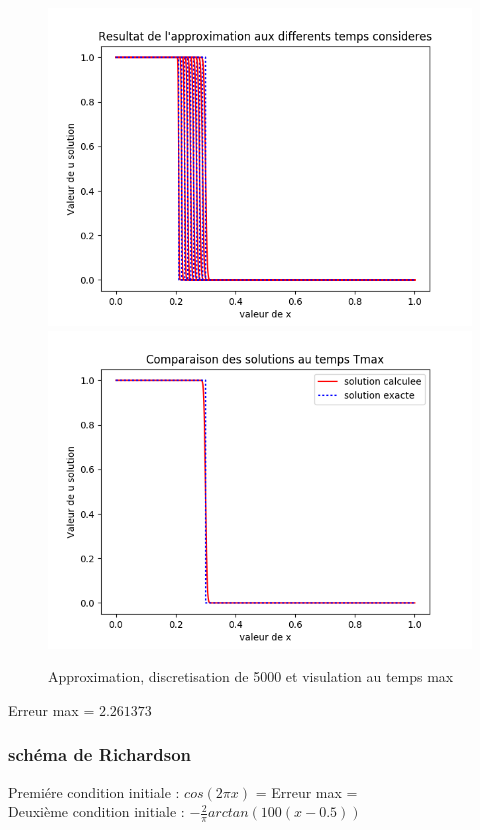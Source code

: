\documentclass[12pt]{article}
\begin{document}
 \begin{figure}[H]
	\centering
	\includegraphics[scale=0.45]{1D_c1_5000_s1_init3.png}
	\includegraphics[scale=0.45]{Temp_max_c1_5000_s1_i3.png}
	\caption{Approximation, discretisation de 5000 et visulation au temps max}
	\label{1D} 
	\end{figure}
Erreur max = $2.261373$
\subsubsection{schéma de Richardson}

Premiére condition initiale : $cos(2 \pi x)$
 =
Erreur max = 
\\Deuxième condition initiale : $-\frac{2}{\pi}arctan(100(x-0.5))$
\end{document}
